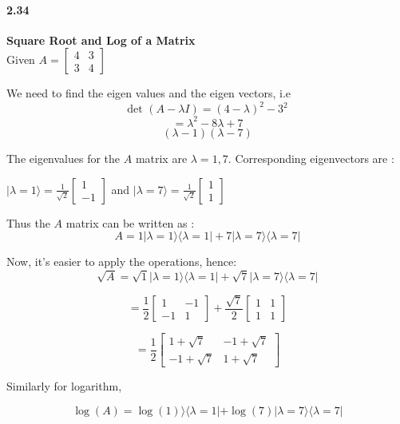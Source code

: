 \paragraph{2.34} \textbf{Square Root and Log of a Matrix}%
\\

Given $A = \begin{bmatrix}
    4 & 3 \\ 3 & 4
\end{bmatrix}$

We need to find the eigen values and the eigen vectors, i.e
$$ \text{det } (A -\lambda I) = (4 - \lambda)^2 - 3^2$$
$$ = \lambda^2 - 8 \lambda + 7$$
$$ (\lambda -1) (\lambda - 7)$$

The eigenvalues for the $A$ matrix are $ \lambda = 1, 7$. Corresponding eigenvectors are :

$|\lambda = 1\rangle = \frac{1}{\sqrt{2}}\begin{bmatrix}
    1 \\ -1
\end{bmatrix} $ and 
$|\lambda = 7\rangle = \frac{1}{\sqrt{2}}\begin{bmatrix}
    1 \\ 1
\end{bmatrix} $ 

Thus the $A$ matrix can be written as :
$$ A = 1|\lambda = 1\rangle \langle \lambda = 1| + 7|\lambda=7\rangle \langle \lambda =7|$$

Now, it's easier to apply the operations, hence:
$$ \sqrt{A} = \sqrt{1}|\lambda = 1\rangle \langle \lambda = 1|+ \sqrt{7}|\lambda=7\rangle \langle \lambda =7|$$

$$ = \frac{1}{2} \begin{bmatrix}
    1 & -1 \\ -1 & 1
\end{bmatrix}  + \frac{\sqrt{7}}{2} \begin{bmatrix}
    1 & 1 \\ 1 & 1
\end{bmatrix}$$

$$ = \frac{1}{2} \begin{bmatrix}
    1 + \sqrt{7} & -1+\sqrt{7} \\
    -1 + \sqrt{7} & 1 + \sqrt{7}
\end{bmatrix}$$

Similarly for logarithm,

$$ \log(A) = \log( 1)\rangle \langle \lambda = 1| + \log(7)|\lambda=7\rangle \langle \lambda =7|$$

